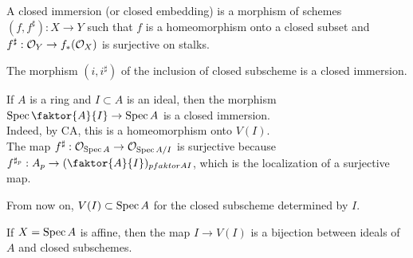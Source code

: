 \documentclass[../main.tex]{subfiles}
\begin{document}
\begin{defn}
	A closed immersion (or closed embedding) is a morphism of schemes $( f,f^{\sharp}) : X\to Y$ such that $f$ is a homeomorphism onto a closed subset and $f^{\sharp}: \mathcal{O}_Y \to f_\ast ( \mathcal{O}_X) $ is surjective on stalks.
\end{defn}
\begin{rmq}
The morphism $( i,i^{\sharp}) $ of the inclusion of closed subscheme is a closed immersion.\\
\end{rmq}
\begin{exemple}
If $A$ is a ring and $ I \subset A$ is an ideal, then the morphism $\spec \faktor{A}{I}\to \spec A$ is a closed immersion.\\

Indeed, by CA, this is a homeomorphism onto $V( I) $.\\
The map $f^{\sharp}: \mathcal{O}_{\operatorname{Spec} A} \to \mathcal{O}_{ \operatorname{Spec} A /I} $ is surjective because $f^{\sharp_p}: A_p \to ( \faktor{A}{I})_{p \\faktor{A}{I}} $, which is the localization of a surjective map.
\end{exemple}
From now on, $V( I) \subset \operatorname{Spec} A$ for the closed subscheme determined by $I$.
\begin{propo}
If $X = \operatorname{Spec} A$ is affine, then the map $I \to V( I) $ is a bijection between ideals of $A$ and closed subschemes.
\end{propo}
\end{document}
